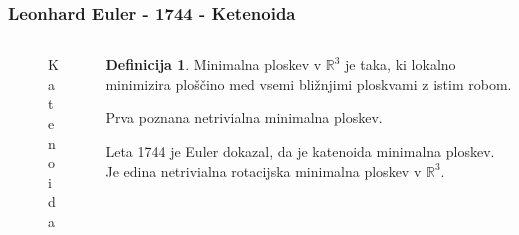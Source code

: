 \documentclass[8pt]{beamer}
\newcommand{\samplescalar}{50} %
\theoremstyle{definition}
\newtheorem{definicija}{Definicija}
\theoremstyle{remark}
\theoremstyle{plain}
\numberwithin{equation}{section}  %
\begin{document}
\begin{frame}
    \frametitle{Leonhard Euler - 1744 - Ketenoida}
    \begin{columns}
        \begin{column}{0.5\textwidth}
            \centering
            \begin{figure}[H]
                \centering
            
                \caption{Katenoida}
            \end{figure}

        \end{column}

        \begin{column}{0.5\textwidth}
            \begin{definicija}
                Minimalna ploskev v $\mathbb{R}^3$ je taka, ki \textcolor{red1}{lokalno minimizira ploščino} med vsemi bližnjimi ploskvami z istim robom.
            \end{definicija}
            \pause
            Prva poznana netrivialna minimalna ploskev. 

            \vspace{0.8em}

            Leta 1744 je Euler dokazal, da je katenoida minimalna ploskev. Je edina netrivialna \textcolor{red1}{rotacijska minimalna ploskev} v $\mathbb{R}^3$. 
            \pause
            \vspace{0.8em}


\end{column}
\end{columns}
\end{frame}
\end{document}
